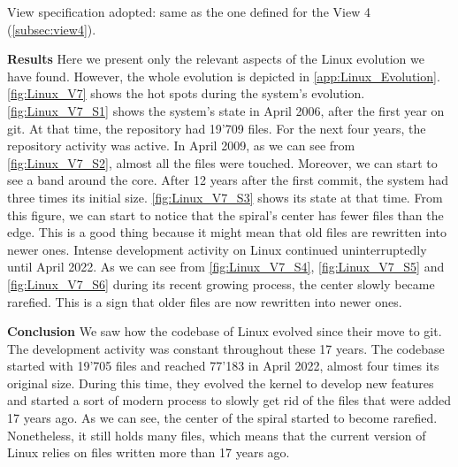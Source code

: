 \bigbreak
View specification adopted: same as the one defined for the View 4 (\autoref{subsec:view4}).

\textbf{Results}
Here we present only the relevant aspects of the Linux evolution we have found. However, the whole evolution is depicted in \autoref{app:Linux_Evolution}. \autoref{fig:Linux_V7} shows the hot spots during the system's evolution. \autoref{fig:Linux_V7_S1} shows the system's state in April 2006, after the first year on git. At that time, the repository had 19'709 files. For the next four years, the repository activity was active. In April 2009, as we can see from  \autoref{fig:Linux_V7_S2}, almost all the files were touched. Moreover, we can start to see a band around the core. 
After 12 years after the first commit, the system had three times its initial size. \autoref{fig:Linux_V7_S3} shows its state at that time. From this figure, we can start to notice that the spiral's center has fewer files than the edge. This is a good thing because it might mean that old files are rewritten into newer ones. Intense development activity on Linux continued uninterruptedly until April 2022. As we can see from \autoref{fig:Linux_V7_S4}, \autoref{fig:Linux_V7_S5} and \autoref{fig:Linux_V7_S6} during its recent growing process, the center slowly became rarefied. This is a sign that older files are now rewritten into newer ones. 

\bigbreak
\textbf{Conclusion}
 We saw how the codebase of Linux evolved since their move to git. The development activity was constant throughout these 17 years. The codebase started with 19'705 files and reached 77'183 in April 2022, almost four times its original size. During this time, they evolved the kernel to develop new features and started a sort of modern process to slowly get rid of the files that were added 17 years ago. As we can see, the center of the spiral started to become rarefied. Nonetheless, it still holds many files, which means that the current version of Linux relies on files written more than 17 years ago. 


